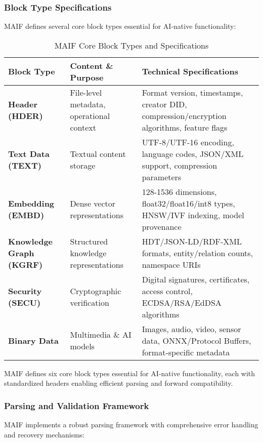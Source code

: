\documentclass[conference]{IEEEtran}
\begin{document}
\subsubsection{Block Type Specifications}

MAIF defines several core block types essential for AI-native functionality:

\begin{table*}[!t]
\renewcommand{\arraystretch}{1.3}
\caption{MAIF Core Block Types and Specifications}
\label{tab:block-types}
\centering
\footnotesize
\begin{tabular}{p{3cm}p{5.5cm}p{5.5cm}}
\toprule
\textbf{Block Type} & \textbf{Content \& Purpose} & \textbf{Technical Specifications} \\
\midrule
\textbf{Header (HDER)} & File-level metadata, operational context & Format version, timestamps, creator DID, compression/encryption algorithms, feature flags \\
\textbf{Text Data (TEXT)} & Textual content storage & UTF-8/UTF-16 encoding, language codes, JSON/XML support, compression parameters \\
\textbf{Embedding (EMBD)} & Dense vector representations & 128-1536 dimensions, float32/float16/int8 types, HNSW/IVF indexing, model provenance \\
\textbf{Knowledge Graph (KGRF)} & Structured knowledge representations & HDT/JSON-LD/RDF-XML formats, entity/relation counts, namespace URIs \\
\textbf{Security (SECU)} & Cryptographic verification & Digital signatures, certificates, access control, ECDSA/RSA/EdDSA algorithms \\
\textbf{Binary Data} & Multimedia \& AI models & Images, audio, video, sensor data, ONNX/Protocol Buffers, format-specific metadata \\
\bottomrule
\end{tabular}
\end{table*}

MAIF defines six core block types essential for AI-native functionality, each with standardized headers enabling efficient parsing and forward compatibility.

\subsubsection{Parsing and Validation Framework}

MAIF implements a robust parsing framework with comprehensive error handling and recovery mechanisms:
\end{document}
